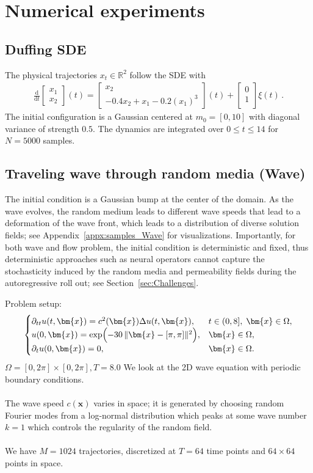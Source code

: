 \documentclass{article}
\theoremstyle{plain}
\theoremstyle{definition}
\theoremstyle{remark}
\newcommand{\lbreak}{\\~\\}
\newcommand{\x}{\bm{x}}
\newcommand{\bR}{\mathbb{R}}
\newcommand{\rd}{\mathrm{d}}
\begin{document}
\section{Numerical experiments}
\subsection{Duffing SDE}
\label{appx:duffsde}
The physical trajectories $x_t \in \bR^2$ follow the SDE  with
\begin{align}
  \frac{\rd}{\rd t}
  \begin{bmatrix}
    x_1 \\
    x_2
  \end{bmatrix}
  (t)
  =
  \begin{bmatrix}
    x_2 \\
    -0.4 x_2 + x_1 - 0.2 (x_1)^3
  \end{bmatrix}
  (t)
  +
  \begin{bmatrix}
    0 \\
    1 \\
  \end{bmatrix}
  \xi(t) \,.
\end{align}
The initial configuration is a Gaussian centered at $m_0 = [0, 10]$ with diagonal variance of strength $0.5$. The dynamics are integrated over $0 \leq t \leq 14$ for $N = 5000$ samples.

\subsection{Traveling wave through random media (Wave)}
\label{appx:wave}
The initial condition is a Gaussian bump at the center of the domain. As the wave evolves, the random medium leads to different wave speeds that lead to a deformation of the wave front, which leads to a distribution of diverse solution fields; see Appendix~\ref{appx:samples_Wave} for visualizations.  Importantly, for both wave and flow problem, the initial condition is deterministic and fixed, thus deterministic approaches such as neural operators cannot capture the stochasticity induced by the random media and permeability fields during the autoregressive roll out; see Section~\ref{sec:Challenges}.

Problem setup:
\[
  \begin{cases}
    \partial_{tt} u(t,\x) = c^2(\x) \Delta  u(t,\x),     & t\in(0,8], \; \x\in \Omega, \\
    u(0,\x) = \exp\Bigl(-30\,\|\x - [\pi,\pi]\|^2\Bigr), & \x\in \Omega,               \\
    \partial_{t} u(0,\x) = 0,                            & \x\in \Omega.
  \end{cases}
\]
$\Omega = [0,2\pi]\times [0,2\pi], T=8.0$
We look at the 2D wave equation with periodic boundary conditions.
\lbreak
The wave speed $c(\x)$ varies in space; it is generated by choosing random Fourier modes from a log-normal distribution which peaks at some wave number $k=1$ which controls the regularity of the random field.
\lbreak
We have $M = 1024$ trajectories, discretized at $T= 64$ time points and $64 \times 64$ points in space.
\end{document}
